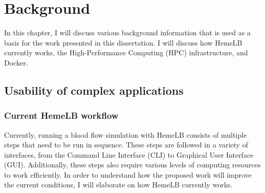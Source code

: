 

\chapter[Background]{Background}

In this chapter, I will discuss various background information that is used as a basis for the work presented in this dissertation. I will discuss how HemeLB currently works, the High-Performance Computing (HPC) infrastructure, and Docker.


\section{Usability of complex applications}

\subsection{Current HemeLB workflow}

Currently, running a blood flow simulation with HemeLB consists of multiple steps that need to be run in sequence. These steps are followed in a variety of interfaces, from the Command Line Interface (CLI) to Graphical User Interface (GUI). Additionally, these steps also require various levels of computing resources to work efficiently. In order to understand how the proposed work will improve the current conditions, I will elaborate on how HemeLB currently works.




\vspace{1cm}

\noindent%
\begin{minipage}{\linewidth}%
\label{fig:hemelb-workflow}%
\end{minipage}

